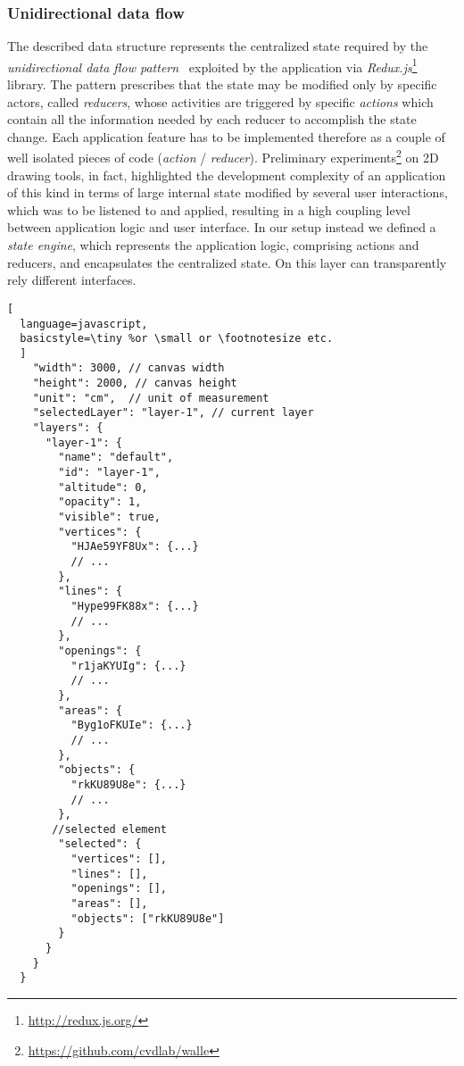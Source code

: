 \subsubsection*{Unidirectional data flow} The described data structure represents the centralized state required by the \emph{unidirectional data flow pattern}~\cite{uniflow} exploited by the application via \emph{Redux.js}\footnote{\url{http://redux.js.org/}} library. The pattern prescribes that the state may be modified only by specific actors, called \emph{reducers}, whose activities are triggered by specific \emph{actions} which contain all the information needed by each reducer to accomplish the state change. Each application feature has to be implemented therefore as a couple of well isolated pieces of code (\emph{action} / \emph{reducer}). Preliminary experiments\footnote{\url{https://github.com/cvdlab/walle}} on 2D drawing tools, in fact, highlighted the development complexity of an application of this kind in terms of large internal state modified by several user interactions, which was to be listened to and applied, resulting in a high coupling level between application logic and user interface. In our setup instead we defined a \emph{state engine}, which represents the application logic, comprising actions and reducers, and encapsulates the centralized state. On this layer can transparently rely different interfaces.
\newpage
\begin{lstlisting}[
  language=javascript,
  basicstyle=\tiny %or \small or \footnotesize etc.
  ]
    "width": 3000, // canvas width
    "height": 2000, // canvas height
    "unit": "cm",  // unit of measurement
    "selectedLayer": "layer-1", // current layer
    "layers": {
      "layer-1": {
        "name": "default",
        "id": "layer-1",
        "altitude": 0,
        "opacity": 1,
        "visible": true,
        "vertices": {
          "HJAe59YF8Ux": {...}
          // ...
        },
        "lines": {
          "Hype99FK88x": {...}
          // ...
        },
        "openings": {
          "r1jaKYUIg": {...}
          // ...
        },
        "areas": {
          "Byg1oFKUIe": {...}
          // ...
        },
        "objects": {
          "rkKU89U8e": {...}
          // ...
        },
       //selected element
        "selected": {
          "vertices": [],
          "lines": [],
          "openings": [],
          "areas": [],
          "objects": ["rkKU89U8e"]
        }
      }
    }
  }
\end{lstlisting}


